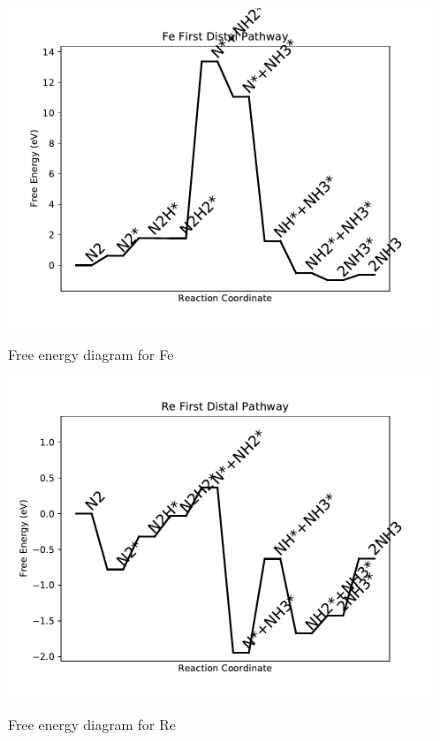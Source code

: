\documentclass{article}
\begin{document}
\newpage
\begin{figure}
\includegraphics[width=1\linewidth]{data/plots/Fe_distal_1.pdf}
\label{fig:Fe_distal_1}
\caption{Free energy diagram for Fe}
\end{figure}

\begin{figure}
\includegraphics[width=1\linewidth]{data/plots/Re_distal_1.pdf}
\label{fig:Re_distal_1}
\caption{Free energy diagram for Re}
\end{figure}
\end{document}
